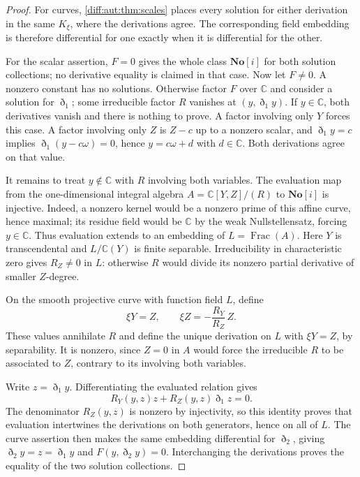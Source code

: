 \documentclass[11pt,letterpaper]{article}
\numberwithin{equation}{section}
\theoremstyle{definition}
\theoremstyle{remark}
\newcommand{\SC}{\mathbf{No}[i]}
\newcommand{\C}{\mathbb C}
\newcommand{\Dn}{\eth}
\begin{document}
\begin{proof}
For curves, \cref{diff:aut:thm:scales} places every solution for
either derivation in the same $K_\xi$, where the derivations agree.
The corresponding field embedding is therefore differential for one
exactly when it is differential for the other.

For the scalar assertion, $F=0$ gives the whole class $\SC$ for
both solution collections; no derivative equality is claimed in
that case. Now let $F\neq0$. A nonzero constant has no solutions.
Otherwise factor $F$ over $\C$ and consider a solution for $\Dn_1$;
some irreducible factor $R$ vanishes at $(y,\Dn_1y)$.
If $y\in\C$, both derivatives vanish and there is nothing to prove.
A factor involving only $Y$ forces this case. A factor involving
only $Z$ is $Z-c$ up to a nonzero scalar, and
$\Dn_1y=c$ implies $\Dn_1(y-c\omega)=0$, hence
$y=c\omega+d$ with $d\in\C$. Both derivations agree on that value.

It remains to treat $y\notin\C$ with $R$ involving both variables.
The evaluation map from the one-dimensional integral algebra
$A=\C[Y,Z]/(R)$ to $\SC$ is injective. Indeed, a nonzero kernel
would be a nonzero prime of this affine curve, hence maximal;
its residue field would be $\C$ by the weak Nullstellensatz,
forcing $y\in\C$. Thus evaluation extends to an embedding of
$L=\operatorname{Frac}(A)$. Here $Y$ is transcendental and
$L/\C(Y)$ is finite separable. Irreducibility in characteristic
zero gives $R_Z\neq0$ in $L$: otherwise $R$ would divide its
nonzero partial derivative of smaller $Z$-degree.

On the smooth projective curve with function field $L$, define
\begin{equation}\label{diff:aut:eq:inducedfield}
 \xi Y=Z,\qquad \xi Z=-\frac{R_Y}{R_Z}\,Z.
\end{equation}
These values annihilate $R$ and define the unique derivation on
$L$ with $\xi Y=Z$, by separability. It is nonzero, since $Z=0$
in $A$ would force the irreducible $R$ to be associated to $Z$,
contrary to its involving both variables.

Write $z=\Dn_1y$. Differentiating the evaluated relation gives
\[
 R_Y(y,z)z+R_Z(y,z)\Dn_1z=0.
\]
The denominator $R_Z(y,z)$ is nonzero by injectivity, so this
identity proves that evaluation intertwines the derivations on
both generators, hence on all of $L$. The curve assertion then
makes the same embedding differential for $\Dn_2$, giving
$\Dn_2y=z=\Dn_1y$ and $F(y,\Dn_2y)=0$.
Interchanging the derivations proves the equality of the two
solution collections.
\end{proof}
\end{document}
